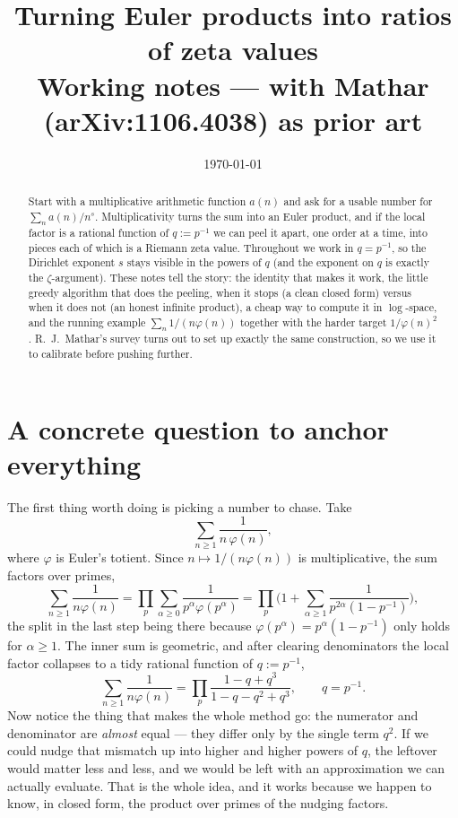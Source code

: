 \documentclass[11pt]{article}
\title{Turning Euler products into ratios of zeta values\\
\large Working notes --- with Mathar (arXiv:1106.4038) as prior art}
\author{}
\date{\today}
\begin{document}
\maketitle

\begin{abstract}
Start with a multiplicative arithmetic function $a(n)$ and ask for a usable number
for $\sum_n a(n)/n^s$. Multiplicativity turns the sum into an Euler product, and if
the local factor is a rational function of $q:=p^{-1}$ we can peel it apart, one
order at a time, into pieces each of which is a Riemann zeta value. Throughout we
work in $q=p^{-1}$, so the Dirichlet exponent $s$ stays visible in the powers of
$q$ (and the exponent on $q$ is exactly the $\zeta$-argument). These notes tell the
story: the identity that makes it work, the little greedy algorithm that does the
peeling, when it stops (a clean closed form) versus when it does not (an honest
infinite product), a cheap way to compute it in $\log$-space, and the running
example $\sum_n 1/(n\varphi(n))$ together with the harder target $1/\varphi(n)^2$.
R.~J.~Mathar's survey \cite{Mathar2011} turns out to set up exactly the same
construction, so we use it to calibrate before pushing further.
\end{abstract}

\tableofcontents

\section{A concrete question to anchor everything}
\label{sec:anchor}

The first thing worth doing is picking a number to chase. Take
\[
\sum_{n\ge1}\frac{1}{n\,\varphi(n)},
\]
where $\varphi$ is Euler's totient. Since $n\mapsto 1/(n\varphi(n))$ is
multiplicative, the sum factors over primes,
\[
\sum_{n\ge1}\frac{1}{n\varphi(n)}
=\prod_{p}\sum_{\alpha\ge0}\frac{1}{p^{\alpha}\varphi(p^{\alpha})}
=\prod_{p}\Big(1+\sum_{\alpha\ge1}\frac{1}{p^{2\alpha}(1-p^{-1})}\Big),
\]
the split in the last step being there because $\varphi(p^\alpha)=p^\alpha(1-p^{-1})$
only holds for $\alpha\ge1$. The inner sum is geometric, and after clearing
denominators the local factor collapses to a tidy rational function of $q:=p^{-1}$,
\[
\sum_{n\ge1}\frac{1}{n\varphi(n)}
=\prod_p\frac{1-q+q^{3}}{1-q-q^{2}+q^{3}},\qquad q=p^{-1}.
\]
Now notice the thing that makes the whole method go: the numerator and denominator
are \emph{almost} equal --- they differ only by the single term $q^2$. If we could
nudge that mismatch up into higher and higher powers of $q$, the leftover would
matter less and less, and we would be left with an approximation we can actually
evaluate. That is the whole idea, and it works because we happen to know, in closed
form, the product over primes of the nudging factors.
\end{document}
